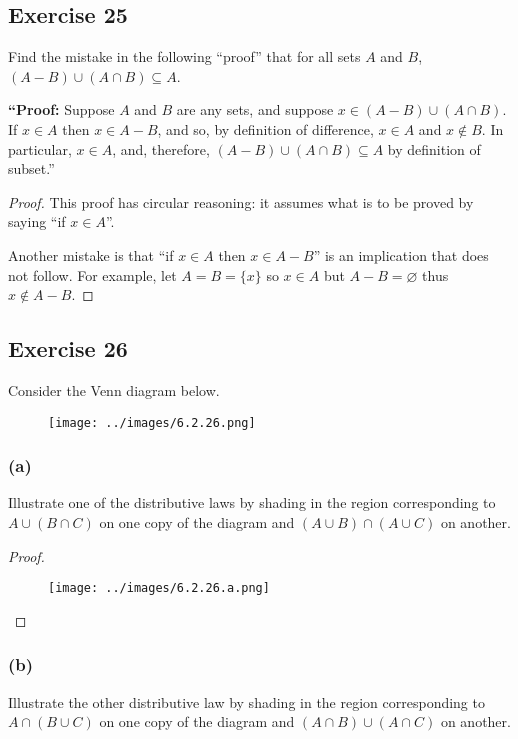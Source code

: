 \documentclass[14pt]{extarticle}
\newcommand{\es}{\varnothing}
\begin{document}
\subsection{Exercise 25}
Find the mistake in the following “proof” that for all sets $A$ and $B$, \((A - B) \cup (A \cap B) \subseteq A\).

  {\bf “Proof:} Suppose $A$ and $B$ are any sets, and suppose \(x \in (A - B) \cup (A \cap B)\). If \(x \in A\) then
\(x \in A - B\), and so, by definition of difference, \(x \in A\) and \(x \notin B\). In particular, \(x \in A\),
and, therefore, \((A - B) \cup (A \cap B) \subseteq A\) by definition of subset.”

\begin{proof}
  This proof has circular reasoning: it assumes what is to be proved by saying ``if $x \in A$''.

  Another mistake is that ``if $x \in A$ then \(x \in A - B\)'' is an implication that does not follow. For example,
  let $A = B = \{x\}$ so $x \in A$ but $A - B = \es$ thus $x \notin A - B$.
\end{proof}

\subsection{Exercise 26}
Consider the Venn diagram below.

\begin{figure}[ht!]
  \centering
  \texttt{[image: ../images/6.2.26.png]}
\end{figure}

\subsubsection{(a)}
Illustrate one of the distributive laws by shading in the region corresponding to \(A \cup (B \cap C)\) on one copy
of the diagram and \((A \cup B) \cap (A \cup C)\) on another.

\begin{proof}
  \begin{figure}[ht!]
    \centering
    \texttt{[image: ../images/6.2.26.a.png]}
  \end{figure}
\end{proof}

\subsubsection{(b)}
Illustrate the other distributive law by shading in the region corresponding to \(A \cap (B \cup C)\) on one copy
of the diagram and \((A \cap B) \cup (A \cap C)\) on another.
\end{document}
